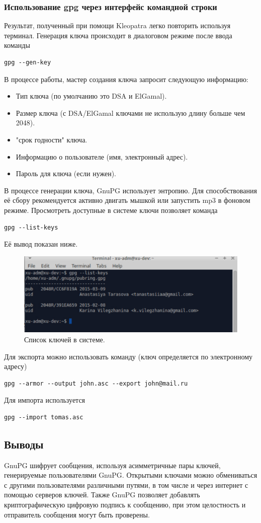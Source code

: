 \documentclass[12pt,a4paper]{article}
\begin{document}
\subsubsection{Использование gpg через интерфейс командной строки}

Результат, полученный при помощи Kleopatra легко повторить используя терминал. Генерация ключа происходит в диалоговом режиме после ввода команды
\begin{verbatim}gpg --gen-key
\end{verbatim}
В процессе работы, мастер создания ключа запросит следующую информацию:
\begin{itemize}
\item{Тип ключа (по умолчанию это DSA и ElGamal).}
\item{Размер ключа (с DSA/ElGamal ключами не использую длину больше чем 2048).}
\item{"срок годности" ключа.}
\item{Информацию о пользователе (имя, электронный адрес).}
\item{Пароль для ключа (если нужен).}
\end{itemize}
В процессе генерации ключа, GnuPG использует энтропию. Для способствования её сбору рекомендуется активно двигать мышкой или запустить mp3 в фоновом режиме.
Просмотреть доступные в системе ключи позволяет команда
\begin{verbatim}gpg --list-keys
\end{verbatim}
Её вывод показан ниже.
\begin{figure}[h!]
\centering
\includegraphics[scale=0.8]{res/gpgterminal}
\caption{Список ключей в системе.}
\end{figure}
Для экспорта можно использовать команду (ключ определяется по электронному адресу)
\begin{verbatim}gpg --armor --output john.asc --export john@mail.ru
\end{verbatim}
Для импорта используется
\begin{verbatim}gpg --import tomas.asc
\end{verbatim}
\subsection{Выводы}
GnuPG шифрует сообщения, используя асимметричные пары ключей, генерируемые пользователями GnuPG. Открытыми ключами можно обмениваться с другими пользователями различными путями, в том числе и через интернет с помощью серверов ключей. Также GnuPG позволяет добавлять криптографическую цифровую подпись к сообщению, при этом целостность и отправитель сообщения могут быть проверены. 
\end{document}
